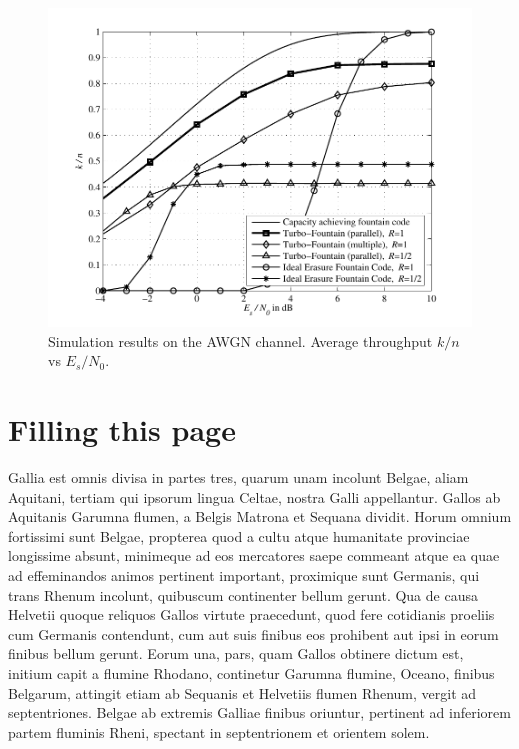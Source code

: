 \documentclass[journal, a4paper]{IEEEtran}
\begin{document}
	\begin{figure}[!hbt]
		\begin{center}
		\includegraphics[width=\columnwidth]{imgs/plot_tf}
		\caption{Simulation results on the AWGN channel. Average throughput $k/n$ vs $E_s/N_0$.}
		\label{fig:tf_plot}
		\end{center}
	\end{figure}

\section{Filling this page}
	Gallia est omnis divisa in partes tres, quarum unam incolunt Belgae, aliam Aquitani, tertiam qui ipsorum lingua Celtae, nostra Galli appellantur. Gallos ab Aquitanis Garumna flumen, a Belgis Matrona et Sequana dividit. Horum omnium fortissimi sunt Belgae, propterea quod a cultu atque humanitate provinciae longissime absunt, minimeque ad eos mercatores saepe commeant atque ea quae ad effeminandos animos pertinent important, proximique sunt Germanis, qui trans Rhenum incolunt, quibuscum continenter bellum gerunt. Qua de causa Helvetii quoque reliquos Gallos virtute praecedunt, quod fere cotidianis proeliis cum Germanis contendunt, cum aut suis finibus eos prohibent aut ipsi in eorum finibus bellum gerunt. Eorum una, pars, quam Gallos obtinere dictum est, initium capit a flumine Rhodano, continetur Garumna flumine, Oceano, finibus Belgarum, attingit etiam ab Sequanis et Helvetiis flumen Rhenum, vergit ad septentriones. Belgae ab extremis Galliae finibus oriuntur, pertinent ad inferiorem partem fluminis Rheni, spectant in septentrionem et orientem solem.
\end{document}

